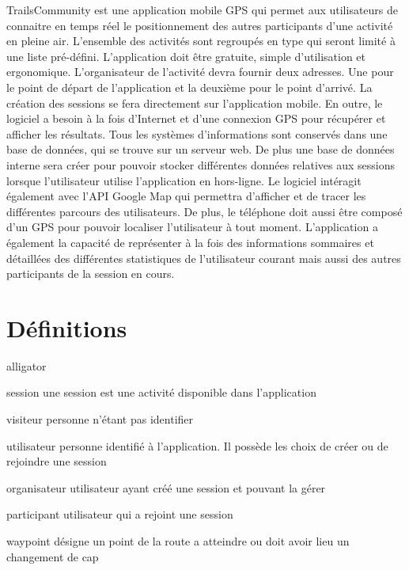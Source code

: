 \documentclass[titlepage, 12pt]{report}
\begin{document}
TrailsCommunity est une application mobile GPS qui permet aux utilisateurs de connaitre en temps réel le positionnement des autres participants d'une activité en pleine air. L'ensemble des activités sont regroupés en type qui seront limité à une liste pré-défini.
L'application doit être gratuite, simple d'utilisation et ergonomique.
L'organisateur de l'activité devra fournir deux adresses. Une pour le point de départ de l'application et la deuxième pour le point d'arrivé. La création des sessions se fera directement sur l'application mobile.
En outre, le logiciel a besoin à la fois d'Internet et d'une connexion GPS pour récupérer et afficher les résultats. Tous les systèmes d'informations sont conservés dans une base de données, qui se trouve sur un serveur web. De plus une base de données interne sera créer pour pouvoir stocker différentes données relatives aux sessions lorsque l'utilisateur utilise l'application en hors-ligne.
Le logiciel intéragit également avec l'API Google Map qui permettra d'afficher et de tracer les différentes parcours des utilisateurs. De plus, le téléphone doit aussi être composé d'un GPS pour pouvoir localiser l'utilisateur à tout moment. 
L'application a également la capacité de représenter à la fois des informations sommaires et détaillées des différentes statistiques de l'utilisateur courant mais aussi des autres participants de la session en cours.

\section{Définitions}
\begin{labeling}{alligator}
	\item [session] une session est une activité disponible dans l’application
	\item [visiteur] personne n’étant pas identifier
	\item [utilisateur] personne identifié à l’application. Il possède les choix de créer ou de rejoindre une session
	\item [organisateur] utilisateur ayant créé une session et pouvant la gérer
	\item [participant] utilisateur qui a rejoint une session
	\item [waypoint] désigne un point de la route a atteindre ou doit avoir lieu un changement de cap
\end{labeling}
\end{document}

